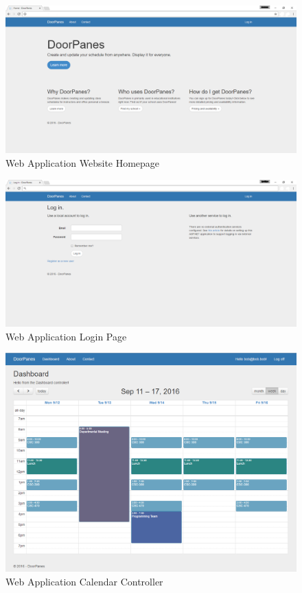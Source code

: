 \begin{figure}[h!]
\centering
\includegraphics[scale=0.35]{DesignImages/DoorPanesWebAppHome.PNG}
\caption{Web Application Website Homepage}
\label{webAppHomePage}
\end{figure} 

\begin{figure}[h!]
\centering
\includegraphics[scale=0.35]{DesignImages/DoorPanesWebAppLogin.PNG}
\caption{Web Application Login Page}
\label{webApplicationLoginPage}
\end{figure} 

\begin{figure}[h!]
\centering
\includegraphics[scale=0.4]{DesignImages/DoorPanesWebAppCal.PNG}
\caption{Web Application Calendar Controller}
\label{webApplicationCalView}
\end{figure} 
 
